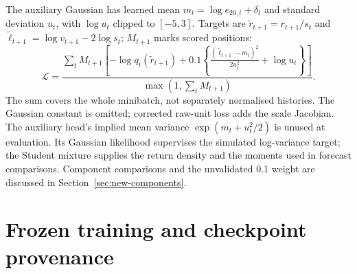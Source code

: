 The auxiliary Gaussian has learned mean $m_t=\log e_{20,t}+\delta_t$ and standard deviation $u_t$, with $\log u_t$ clipped to $[-5,3]$. Targets are $\widetilde r_{t+1}=r_{t+1}/s_t$ and $\widetilde\ell_{t+1}=\log v_{t+1}-2\log s_t$; $M_{t+1}$ marks scored positions:
\begin{equation}
 \mathcal L=
 \frac{\sum_t M_{t+1}\left[-\log q_t(\widetilde r_{t+1})+
 0.1\left\{\frac{(\widetilde\ell_{t+1}-m_t)^2}{2u_t^2}+\log u_t\right\}\right]}
 {\max(1,\sum_t M_{t+1})}.
 \label{eq:volpfn-training-details}
\end{equation}
The sum covers the whole minibatch, not separately normalised histories. The Gaussian constant is omitted; corrected raw-unit loss adds the scale Jacobian. The auxiliary head's implied mean variance $\exp(m_t+u_t^2/2)$ is unused at evaluation. Its Gaussian likelihood supervises the simulated log-variance target; the Student mixture supplies the return density and the moments used in forecast comparisons. Component comparisons and the unvalidated 0.1 weight are discussed in Section~\ref{sec:new-components}.

\section{Frozen training and checkpoint provenance}

